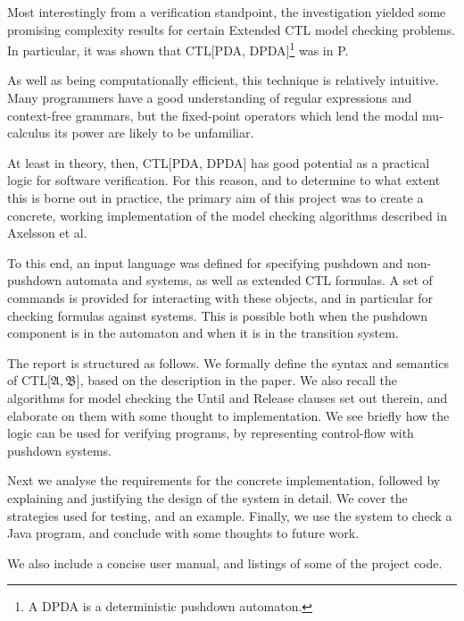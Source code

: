 \documentclass[11pt]{article}
\theoremstyle{definition}
\begin{document}
Most interestingly from a verification standpoint, the investigation yielded
some promising complexity results for certain Extended CTL model checking
problems. In particular, it was shown  that CTL[PDA, DPDA]\footnote{A
DPDA is a deterministic pushdown automaton.} was in P.

As well as being computationally efficient, this technique is relatively
intuitive. Many programmers have a good understanding of regular expressions
and context-free grammars, but the fixed-point operators which lend the modal
mu-calculus its power are likely to be unfamiliar.


At least in theory, then, CTL[PDA, DPDA] has good potential as a practical
logic for software verification. For this reason, and to determine to what
extent this is borne out in practice, the primary aim of this project was to
create a concrete, working implementation of the model checking algorithms
described in Axelsson et al.


To this end, an input language was defined for specifying pushdown and
non-pushdown automata and systems, as well as extended CTL formulas.  A set of
commands is provided for interacting with these objects, and in particular for
checking formulas against systems.  This is possible both when the pushdown
component is in the automaton and when it is in the transition system.



The report is structured as follows. We formally define the syntax and
semantics of CTL[$\mathfrak{A}, \mathfrak{B}$], based on the description in the
paper. We also recall the algorithms for model checking the Until and Release
clauses set out therein, and elaborate on them with some thought to
implementation. We see briefly how the logic can be used for verifying
programs, by representing
control-flow with pushdown systems. 

Next we analyse the requirements for the concrete implementation, followed by
explaining and justifying the design of the system in detail. We cover the
strategies used for testing, and an example. Finally, we use the system to
check a Java program, and conclude with some thoughts to future work.

We also include a concise user manual, and listings of some of the project
code.
\end{document}
